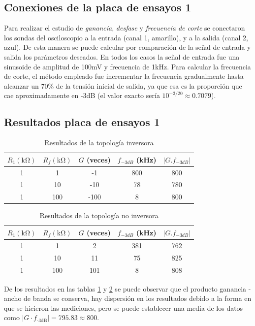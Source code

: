 \documentclass[letterpaper, 10 pt, conference]{ieeeconf}  %
\begin{document}
\subsection{Conexiones de la placa de ensayos 1}
Para realizar el estudio de \textit{ganancia}, \textit{desfase} y \textit{frecuencia de corte} se conectaron los sondas del osciloscopio a la entrada (canal 1, amarillo), y a la salida (canal 2, azul). De esta manera se puede calcular por comparación de la señal de entrada y salida los parámetros deseados. En todos los casos la señal de entrada fue una sinusoide de amplitud de 100mV y frecuencia de 1kHz. Para calcular la frecuencia de corte, el método empleado fue incrementar la frecuencia gradualmente hasta alcanzar un 70\% de la tensión inicial de salida, ya que esa es la proporción que cae aproximadamente en -3dB (el valor exacto sería $10^{-3/20} \approx 0.7079$).

\subsection{Resultados placa de ensayos 1}
\begin{table}[H]
\centering
\caption{Resultados de la topología inversora}
\label{tab:resultadosInversora}
\begin{tabular}{|c|c|c|c|c|}
\hline
$R_{1} (\unit{\kilo\ohm})$ & $R_{f} (\unit{\kilo\ohm})$ & $G$ (veces) & $f_{-3dB}$ (\unit{\kilo\hertz}) & $|G.f_{-3dB}|$ \\
\hline
1 & 1 & -1 & 800 & 800 \\
1 & 10 & -10 & 78 & 780 \\
1 & 100 & -100 & 8 & 800 \\
\hline
\end{tabular}
\end{table}
\begin{table}[H]
\centering
\caption{Resultados de la topología no inversora}
\label{tab:resultadosNoInversora}
\begin{tabular}{|c|c|c|c|c|}
\hline
$R_{1} (\unit{\kilo\ohm})$ & $R_{f} (\unit{\kilo\ohm})$ & $G$ (veces) & $f_{-3dB}$ (\unit{\kilo\hertz}) & $|G.f_{-3dB}|$ \\
\hline
1 & 1 & 2 & 381 & 762 \\
1 & 10 & 11 & 75 & 825 \\
1 & 100 & 101 & 8 & 808 \\
\hline
\end{tabular}
\end{table}

De los resultados en las tablas \ref{tab:resultadosInversora} y \ref{tab:resultadosNoInversora} se puede observar que el producto ganancia - ancho de banda se conserva, hay dispersión en los resultados debido a la forma en que se hicieron las mediciones, pero se puede establecer una media de los datos como $\overline{|G \cdot f_{\text{-3dB}}|} = 795.83 \approx 800 $.
\end{document}
